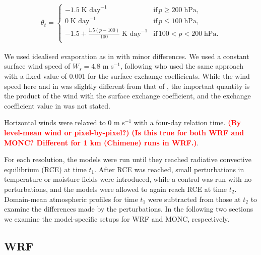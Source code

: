 \documentclass[draft]{agujournal2019}
\newcommand{\todo}[1]{\textcolor{red}{\textbf{(#1)}}}
\begin{document}
\begin{align}
 \theta_t = \begin{cases}
    -1.5\; \textrm{K day}^{-1} & \textrm{if}\, p \geq 200\; \textrm{hPa}, \\
    0\; \textrm{K day}^{-1} & \textrm{if}\, p \leq 100\; \textrm{hPa}, \\
    -1.5 + \frac{1.5 (p-100)}{100}\; \textrm{K day}^{-1} & \textrm{if}\, 100 < p < 200\; \textrm{hPa}. \\
 \end{cases}
\end{align}

We used idealised evaporation as in  with minor
differences. We used a constant surface wind speed of $W_s = 4.8$ m s$^{-1}$,
following  who used the same approach with a fixed value
of 0.001 for the surface exchange coefficients. While the wind speed here and in
 was slightly different from that of
, the important quantity is the product of the wind with
the surface exchange coefficient, and the exchange coefficient value in
 was not stated.

Horizontal winds were relaxed to 0 m s$^{-1}$ with a four-day relation time.
\todo{By level-mean wind or pixel-by-pixel?} \todo{Is this true for both WRF and
MONC? Different for 1 km (Chimene) runs in WRF.}.

For each resolution, the models were run until they reached radiative convective
equilibrium (RCE) at time $t_1$. After RCE was reached, small perturbations in
temperature or moisture fields were introduced, while a control was run with no
perturbations, and the models were allowed to again reach RCE at time $t_2$.
Domain-mean atmospheric profiles for time $t_1$ were subtracted from those at
$t_2$ to examine the differences made by the perturbations. In the following two
sections we examine the model-specific setups for WRF and MONC, respectively.

\subsection{WRF}
\end{document}
